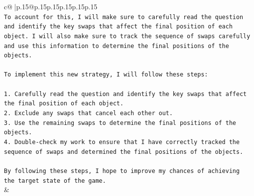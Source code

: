 \documentclass{article}
\begin{document}
{\begin{supertabular}{c@{$\;$}|p{.15\linewidth}@{}p{.15\linewidth}p{.15\linewidth}p{.15\linewidth}p{.15\linewidth}p{.15\linewidth}}
{{{\\ 
\texttt{To account for this, I will make sure to carefully read the question and identify the key swaps that affect the final position of each object. I will also make sure to track the sequence of swaps carefully and use this information to determine the final positions of the objects.} \\
\\ 
\texttt{To implement this new strategy, I will follow these steps:} \\
\\ 
\texttt{1. Carefully read the question and identify the key swaps that affect the final position of each object.} \\
\texttt{2. Exclude any swaps that cancel each other out.} \\
\texttt{3. Use the remaining swaps to determine the final positions of the objects.} \\
\texttt{4. Double{-}check my work to ensure that I have correctly tracked the sequence of swaps and determined the final positions of the objects.} \\
\\ 
\texttt{By following these steps, I hope to improve my chances of achieving the target state of the game.} \\
            }
        }
    }
    & \\ \\

\end{supertabular}
}
\end{document}
